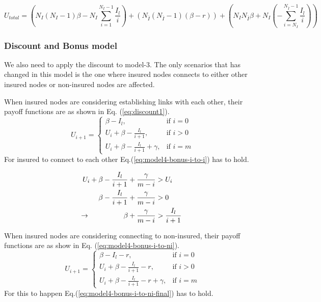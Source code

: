 \begin{equation}
U_{total}=(N_{I}(N_{I}-1)\beta-N_{I} \sum_{i=1}^{N_{I}-1} \frac{I_{l}}{i})+(N_{\overline{I}}(N_{\overline{I}}-1)(\beta-r))+(N_{I}N_{\overline{I}}\beta+N_{I}(-\sum_{i=N_{I}}^{N_{\overline{I}}-1}\frac{I_{l}}{i}))
\label{eq:model4-discount-total-payoff}
\end{equation}

\subsubsection{Discount and Bonus model}
We also need to apply the discount to model-3. The only scenarios that has changed in this model is the one where insured nodes connects to either other insured nodes or non-insured nodes are affected.

When insured nodes are considering establishing links with each other, their payoff functions are as shown in Eq. (\ref{eq:discount1}).  
\begin{equation}
    U_{i+1}= 
\begin{cases}
    \beta - I_{l},& \text{if } i = 0\\
    U_{i}+\beta -\frac{I_{l}}{i+1},& \text{if }  i>0\\
    U_{i}+\beta -\frac{I_{l}}{i+1}+\gamma,& \text{if } i=m
\end{cases}
\label{eq:discount1}
\end{equation}
For insured to connect to each other Eq.(\ref{eq:model4-bonus-i-to-i}) has to hold.

\begin{eqnarray}
U_{i}+\beta-\frac{I_{l}}{i+1}+\frac{\gamma}{m-i}&>U_{i} \nonumber \\ 
\beta-\frac{I_{l}}{i+1}+\frac{\gamma}{m-i}&>0 \nonumber \\ 
\llap{$\rightarrow$\hspace{50pt}}\beta +\frac{\gamma}{m-i}&>\frac{I_{l}}{i+1}
\label{eq:model4-bonus-i-to-i}
\end{eqnarray}

When insured nodes are considering connecting to non-insured, their payoff functions are as show in Eq. (\ref{eq:model4-bonus-i-to-ni}).
\begin{equation}
U_{i+1}= 
\begin{cases}
    \beta - I_{l}-r,& \text{if } i = 0\\
    U_{i}+\beta -\frac{I_{l}}{i+1}-r,& \text{if }  i>0\\
    U_{i}+\beta -\frac{I_{l}}{i+1}-r+\gamma,& \text{if } i=m
\end{cases}
\label{eq:model4-bonus-i-to-ni}
\end{equation}
For this to happen Eq.(\ref{eq:model4-bonus-i-to-ni-final}) has to hold.

